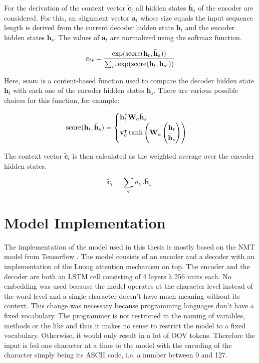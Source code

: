 For the derivation of the context vector \(\tilde{\mathbf{c}}_t\) all hidden states \(\bar{\mathbf{h}}_s\) of the encoder are considered. For this, an alignment vector \(\mathbf{a}_t\) whose size equals the input sequence length is derived from the current decoder hidden state \(\mathbf{h}_t\) and the encoder hidden states \(\bar{\mathbf{h}}_s\). The values of \(\mathbf{a}_t\) are normalized using the softmax function.

\begin{equation*}
  a_{ts} = \frac
            {\exp(\operatorname{score}(\mathbf{h}_t, \bar{\mathbf{h}}_s))}
            {\sum_{s'} \exp(\operatorname{score}(\mathbf{h}_t, \bar{\mathbf{h}}_{s'}))}
\end{equation*}

Here, \(\operatorname{score}\) is a content-based function used to compare the decoder hidden state \(\mathbf{h}_t\) with each one of the encoder hidden states \(\bar{\mathbf{h}}_s\). There are various possible choices for this function, for example:

\begin{equation*}
  \operatorname{score}(\mathbf{h}_t, \bar{\mathbf{h}}_s) =
  \begin{cases}
    \mathbf{h}_t^\intercal \mathbf{W}_a \bar{\mathbf{h}}_s \\
    \mathbf{v}_a^\intercal \tanh \left(\mathbf{W}_a \begin{pmatrix} \mathbf{h}_t \\ \bar{\mathbf{h}}_s \end{pmatrix} \right)
  \end{cases}
\end{equation*}

The context vector \(\tilde{\mathbf{c}}_t\) is then calculated as the weighted average over the encoder hidden states.

\begin{equation*}
  \tilde{\mathbf{c}}_t = \sum_{s'} a_{ts'} \bar{\mathbf{h}}_{s'}
\end{equation*}

\section{Model Implementation}

The implementation of the model used in this thesis is mostly based on the NMT model from Tensorflow \cite{seq2seq_tutorial}. The model consists of an encoder and a decoder with an implementation of the Luong attention mechanism \cite{attention_luong} on top. The encoder and the decoder are both an LSTM cell consisting of 4 layers \`a 256 units each. No embedding was used because the model operates at the character level instead of the word level and a single character doesn't have much meaning without its context. This change was necessary because programming languages don't have a fixed vocabulary. The programmer is not restricted in the naming of variables, methods or the like and thus it makes no sense to restrict the model to a fixed vocabulary. Otherwise, it would only result in a lot of OOV tokens. Therefore the input is fed one character at a time to the model with the encoding of the character simply being its ASCII code, i.e. a number between 0 and 127.

